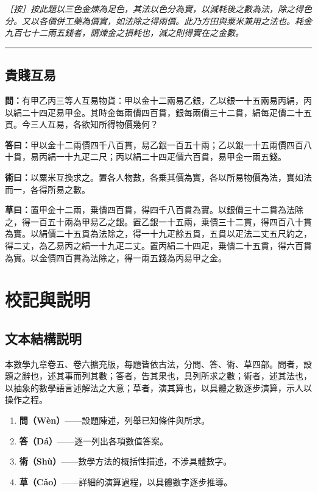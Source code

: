 \documentclass[11pt,a4paper]{article}
\newcommand{\longline}{\noindent\rule{\textwidth}{0.4pt}}
\newcommand{\Question}[1]{\par\noindent\textbf{\color{problemcolor}問：}#1\par}
\newcommand{\Answer}[1]{\par\noindent\textbf{\color{answercolor}答曰：}#1\par}
\newcommand{\Method}[1]{\par\noindent\textbf{\color{methodcolor}術曰：}#1\par}
\newcommand{\Working}[1]{\par\noindent\textbf{草曰：}#1\par}
\newcommand{\EditorialNote}[1]{\par\noindent\textit{［按］#1}\par}
\begin{document}
\EditorialNote{按此題以三色金煉為足色，其法以色分為實，以減耗後之數為法，除之得色分。又以各價併工藥為價實，如法除之得兩價。此乃方田與粟米兼用之法也。耗金九百七十二兩五錢者，謂煉金之損耗也，減之則得實在之金數。}

\longline

\subsection*{\color{sectioncolor}貴賤互易}

\Question{有甲乙丙三等人互易物貨：甲以金十二兩易乙銀，乙以銀一十五兩易丙絹，丙以絹二十四疋易甲金。其時金每兩價四百貫，銀每兩價三十二貫，絹每疋價二十五貫。今三人互易，各欲知所得物價幾何？}

\Answer{甲以金十二兩價四千八百貫，易乙銀一百五十兩；乙以銀一十五兩價四百八十貫，易丙絹一十九疋二尺；丙以絹二十四疋價六百貫，易甲金一兩五錢。}

\Method{以粟米互換求之。置各人物數，各乗其價為實，各以所易物價為法，實如法而一，各得所易之數。}

\Working{置甲金十二兩，乗價四百貫，得四千八百貫為實。以銀價三十二貫為法除之，得一百五十兩為甲易乙之銀。置乙銀一十五兩，乗價三十二貫，得四百八十貫為實。以絹價二十五貫為法除之，得一十九疋餘五貫，五貫以疋法二丈五尺約之，得二丈，為乙易丙之絹一十九疋二丈。置丙絹二十四疋，乗價二十五貫，得六百貫為實。以金價四百貫為法除之，得一兩五錢為丙易甲之金。}


\newpage
\section*{\color{titlecolor}校記與説明}

\subsection*{文本結構説明}

本數學九章卷五、卷六擴充版，每題皆依古法，分問、答、術、草四部。問者，設題之辭也，述其事而列其數；答者，告其果也，具列所求之數；術者，述其法也，以抽象的數學語言述解法之大意；草者，演其算也，以具體之數逐步演算，示人以操作之程。

\begin{enumerate}
    \item \textbf{問（Wèn）}——設題陳述，列舉已知條件與所求。
    \item \textbf{答（Dá）}——逐一列出各項數值答案。
    \item \textbf{術（Shù）}——數學方法的概括性描述，不涉具體數字。
    \item \textbf{草（Cǎo）}——詳細的演算過程，以具體數字逐步推導。
\end{enumerate}
\end{document}
